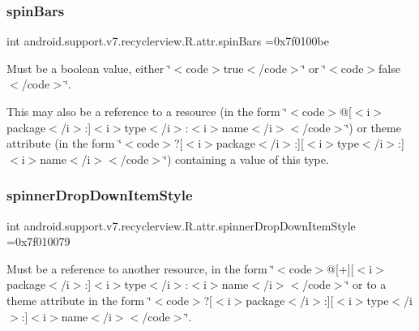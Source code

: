 \subsubsection{\texorpdfstring{spin\+Bars}{spinBars}}
{\footnotesize\ttfamily int android.\+support.\+v7.\+recyclerview.\+R.\+attr.\+spin\+Bars =0x7f0100be\hspace{0.3cm}{\ttfamily [static]}}

Must be a boolean value, either \char`\"{}$<$code$>$true$<$/code$>$\char`\"{} or \char`\"{}$<$code$>$false$<$/code$>$\char`\"{}. 

This may also be a reference to a resource (in the form \char`\"{}$<$code$>$@\mbox{[}$<$i$>$package$<$/i$>$\+:\mbox{]}$<$i$>$type$<$/i$>$\+:$<$i$>$name$<$/i$>$$<$/code$>$\char`\"{}) or theme attribute (in the form \char`\"{}$<$code$>$?\mbox{[}$<$i$>$package$<$/i$>$\+:\mbox{]}\mbox{[}$<$i$>$type$<$/i$>$\+:\mbox{]}$<$i$>$name$<$/i$>$$<$/code$>$\char`\"{}) containing a value of this type. \mbox{\label{classandroid_1_1support_1_1v7_1_1recyclerview_1_1R_1_1attr_a22bda7d75a845b028031de2ae3ae6785}} 
\subsubsection{\texorpdfstring{spinner\+Drop\+Down\+Item\+Style}{spinnerDropDownItemStyle}}
{\footnotesize\ttfamily int android.\+support.\+v7.\+recyclerview.\+R.\+attr.\+spinner\+Drop\+Down\+Item\+Style =0x7f010079\hspace{0.3cm}{\ttfamily [static]}}

Must be a reference to another resource, in the form \char`\"{}$<$code$>$@\mbox{[}+\mbox{]}\mbox{[}$<$i$>$package$<$/i$>$\+:\mbox{]}$<$i$>$type$<$/i$>$\+:$<$i$>$name$<$/i$>$$<$/code$>$\char`\"{} or to a theme attribute in the form \char`\"{}$<$code$>$?\mbox{[}$<$i$>$package$<$/i$>$\+:\mbox{]}\mbox{[}$<$i$>$type$<$/i$>$\+:\mbox{]}$<$i$>$name$<$/i$>$$<$/code$>$\char`\"{}. \mbox{\label{classandroid_1_1support_1_1v7_1_1recyclerview_1_1R_1_1attr_add00d782ec20738f241cee6e09f89093}} 

